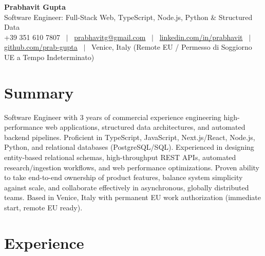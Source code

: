 \documentclass[a4paper,10pt]{article}
\begin{document}
\begin{minipage}[c]{0.80\textwidth}
  {\Huge\bfseries Prabhavit Gupta}\\[3pt]
  {\color{accent}\large Software Engineer: Full-Stack Web, TypeScript, Node.js, Python \& Structured Data}\\[6pt]
  {\footnotesize +39 351 610 7807 ~$\vert$~
  \href{mailto:prabhavitg@gmail.com}{prabhavitg@gmail.com} ~$\vert$~
  \href{https://www.linkedin.com/in/prabhavit/}{linkedin.com/in/prabhavit} ~$\vert$~
  \href{https://github.com/prab-gupta}{github.com/prab-gupta} ~$\vert$~
  Venice, Italy (Remote EU / Permesso di Soggiorno UE a Tempo Indeterminato)}
\end{minipage}\hfill

\section{Summary}
Software Engineer with 3 years of commercial experience engineering high-performance web applications, structured data architectures, and automated backend pipelines. Proficient in TypeScript, JavaScript, Next.js/React, Node.js, Python, and relational databases (PostgreSQL/SQL). Experienced in designing entity-based relational schemas, high-throughput REST APIs, automated research/ingestion workflows, and web performance optimizations. Proven ability to take end-to-end ownership of product features, balance system simplicity against scale, and collaborate effectively in asynchronous, globally distributed teams. Based in Venice, Italy with permanent EU work authorization (immediate start, remote EU ready).

\section{Experience}
\end{document}
